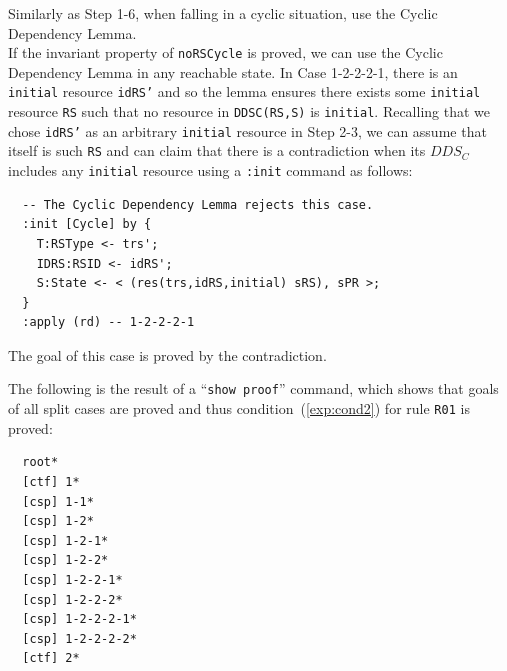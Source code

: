 \documentclass[12pt]{report}
\newcommand{\stt}[1]{{\small{\tt {#1}}}}
\begin{document}
 Similarly as Step 1-6, when falling in a
cyclic situation, use the Cyclic Dependency Lemma. \\
If the invariant property of {\tt noRSCycle} is proved, we can use the
Cyclic Dependency Lemma in any reachable state. In Case 1-2-2-2-1,
there is an {\tt initial} resource {\tt idRS'} and so the lemma ensures
there exists some {\tt initial} resource {\tt RS} such that no
resource in \stt{DDSC(RS,S)} is {\tt initial}. Recalling that we chose
{\tt idRS'} as an arbitrary {\tt initial} resource in Step 2-3, we can
assume that itself is such {\tt RS} and can claim that there is a
contradiction when its $DDS\!_C$ includes any {\tt initial} resource
using a {\tt :init} command as follows:
\small
\begin{verbatim}
  -- The Cyclic Dependency Lemma rejects this case.
  :init [Cycle] by {
    T:RSType <- trs';
    IDRS:RSID <- idRS';
    S:State <- < (res(trs,idRS,initial) sRS), sPR >;
  }
  :apply (rd) -- 1-2-2-2-1
\end{verbatim}
\normalsize
The goal of this case is proved by the contradiction.

The following is the result of a ``\stt{show proof}'' command, which shows
that goals of all split cases are proved and thus
condition~(\ref{exp:cond2}) for rule {\tt R01} is proved:
\small
\begin{verbatim}
  root*
  [ctf] 1*
  [csp] 1-1*
  [csp] 1-2*
  [csp] 1-2-1*
  [csp] 1-2-2*
  [csp] 1-2-2-1*
  [csp] 1-2-2-2*
  [csp] 1-2-2-2-1*
  [csp] 1-2-2-2-2*
  [ctf] 2*
\end{verbatim}
\normalsize
\end{document}
